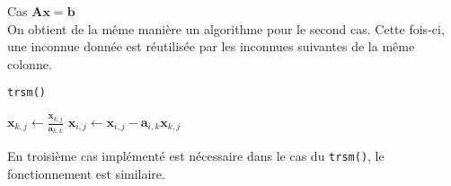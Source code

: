 \large Cas $\mathbf{Ax=b}$\\

On obtient de la même manière un algorithme pour le second cas. Cette fois-ci, une inconnue donnée est réutilisée par les inconnues suivantes de la même colonne.

\begin{algorithm}
\caption*{\texttt{trsm()}}
\begin{algorithmic}
            \State$\mathbf{x}_{k,j}\gets\frac{\mathbf{x}_{k,j}}{\mathbf{a}_{k,k}}$
        \EndFor
                \State$\mathbf{x}_{i,j}\gets\mathbf{x}_{i,j}-\mathbf{a}_{i,k}\mathbf{x}_{k,j}$
            \EndFor
        \EndFor
    \EndFor
\end{algorithmic}

En troisième cas implémenté est nécessaire dans le cas du \texttt{trsm()}, le fonctionnement est similaire.

\end{algorithm}
